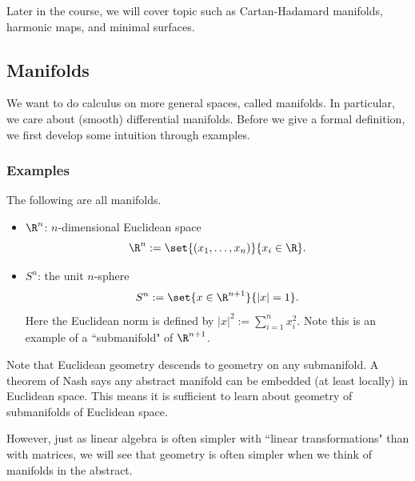 Later in the course, we will cover topic such as Cartan-Hadamard manifolds, harmonic maps, and minimal surfaces.

\subsection{Manifolds}

We want to do calculus on more general spaces, called manifolds. In particular, we care about (smooth) differential manifolds. Before we give a formal definition, we first develop some intuition through examples.

\subsubsection{Examples}

The following are all manifolds.
\begin{itemize}
\item
$\R^n$: $n$-dimensional Euclidean space 
\[\R^n:=\set{(x_1,\ldots,x_n)}{x_i\in \R}.\]
\item
$S^n$: the unit $n$-sphere 
\[S^n:=\set{x\in \R^{n+1}}{|x|=1}.\]
Here the Euclidean norm is defined by $|x|^2:=\sum_{i=1}^n x_i^2$. Note this is an example of a ``submanifold" of $\R^{n+1}$. %
\end{itemize}
Note that Euclidean geometry descends to geometry on any submanifold. A theorem of Nash says any abstract manifold can be embedded (at least locally) in Euclidean space. This means it is sufficient to learn about geometry of submanifolds of Euclidean space. %

However, just as linear algebra is often simpler with ``linear transformations" than with matrices, we will see that geometry is often simpler when we think of manifolds in the abstract.


